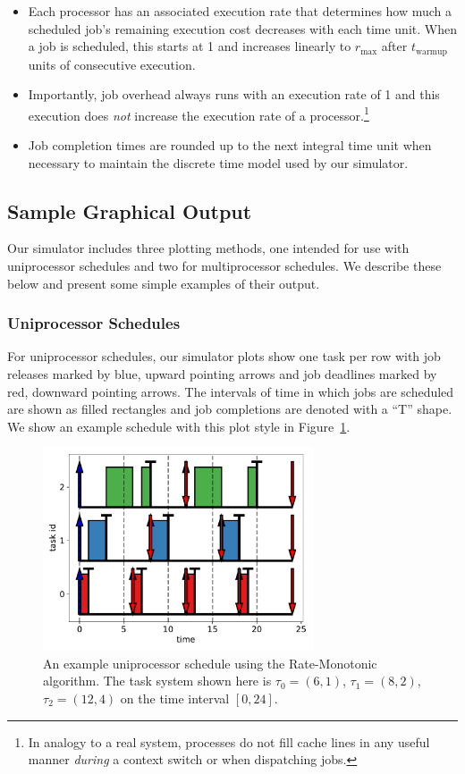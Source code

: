 \documentclass[11pt]{article}
\newcommand{\figref}[1]{Figure~\ref{#1}}
\begin{document}
\begin{itemize}\itemsep0em
	\item Each processor has an associated execution rate that determines how much a scheduled job's remaining execution cost decreases with each time unit. When a job is scheduled, this starts at 1 and increases linearly to $r_\text{max}$ after $t_\text{warmup}$ units of consecutive execution.
	\item Importantly, job overhead always runs with an execution rate of 1 and this execution does \emph{not} increase the execution rate of a processor.\footnote{In analogy to a real system, processes do not fill cache lines in any useful manner \emph{during} a context switch or when dispatching jobs.}
	\item Job completion times are rounded up to the next integral time unit when necessary to maintain the discrete time model used by our simulator.
\end{itemize}

\subsection{Sample Graphical Output}

Our simulator includes three plotting methods, one intended for use with uniprocessor schedules and two for multiprocessor schedules. We describe these below and present some simple examples of their output.

\subsubsection{Uniprocessor Schedules}

For uniprocessor schedules, our simulator plots show one task per row with job releases marked by blue, upward pointing arrows and job deadlines marked by red, downward pointing arrows. The intervals of time in which jobs are scheduled are shown as filled rectangles and job completions are denoted with a ``T'' shape. We show an example schedule with this plot style in \figref{fig:RM_uniprocessor_plot}.

\begin{figure}
	\centering
	\includegraphics[width=8cm]{RM_uniprocessor_example.pdf}
	\caption{An example uniprocessor schedule using the Rate-Monotonic algorithm. The task system shown here is $\tau_0=(6,1)$, $\tau_1=(8,2)$, $\tau_2=(12,4)$ on the time interval $[0, 24]$.}
	\label{fig:RM_uniprocessor_plot}
\end{figure}
\end{document}
